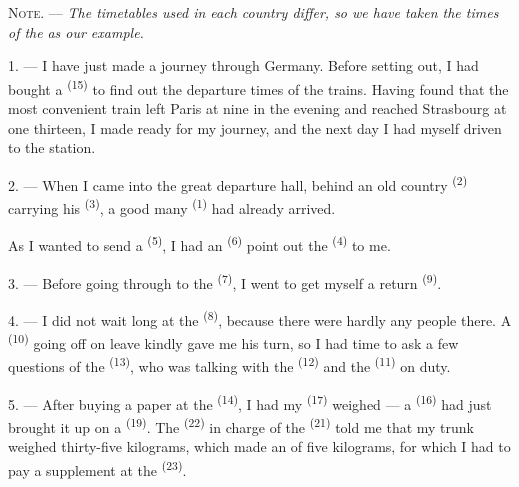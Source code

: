 
\VUsaut{4.0mm}
\VUsaut{2.4mm}
\VUsaut{3.4mm}
\textsc{Note.} --- \textit{The timetables used in each country differ, so we have taken the
times of the}
 \textit{as our example.}

1. --- I have just made a journey through Germany. Before setting out, I had bought a
 \textsuperscript{(15)} to find out the departure times of the trains.
Having found that the most convenient train left Paris at nine in the evening and reached
Strasbourg at one thirteen, I made ready for my journey, and the next day I had myself driven
to the station.

2. --- When I came into the great departure hall, behind an old country
 \textsuperscript{(2)} carrying his 
\textsuperscript{(3)}, a good many  \textsuperscript{(1)} had already
arrived.

As I wanted to send a  \textsuperscript{(5)}, I had an
 \textsuperscript{(6)} point out the 
\textsuperscript{(4)} to me.

3. --- Before going through to the  \textsuperscript{(7)}, I went to get
myself a return  \textsuperscript{(9)}.

4. --- I did not wait long at the  \textsuperscript{(8)}, because there
were hardly any people there. A  \textsuperscript{(10)} going off on leave
kindly gave me his turn, so I had time to ask a few questions of the 
\textsuperscript{(13)}, who was talking with the 
\textsuperscript{(12)} and the  \textsuperscript{(11)} on duty.

\VUsaut{3.0mm}

5. --- After buying a paper at the  \textsuperscript{(14)}, I had my
 \textsuperscript{(17)} weighed --- a  \textsuperscript{(16)} had
just brought it up on a  \textsuperscript{(19)}. The
 \textsuperscript{(22)} in charge of the 
\textsuperscript{(21)} told me that my trunk weighed thirty-five kilograms, which made an
 of five kilograms, for which I had to pay a supplement at the
 \textsuperscript{(23)}.

